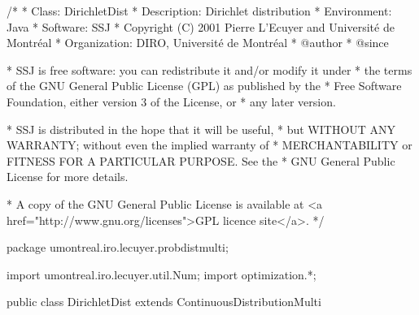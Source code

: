 \begin{code}
\begin{hide}
/*
 * Class:        DirichletDist
 * Description:  Dirichlet distribution
 * Environment:  Java
 * Software:     SSJ 
 * Copyright (C) 2001  Pierre L'Ecuyer and Université de Montréal
 * Organization: DIRO, Université de Montréal
 * @author       
 * @since

 * SSJ is free software: you can redistribute it and/or modify it under
 * the terms of the GNU General Public License (GPL) as published by the
 * Free Software Foundation, either version 3 of the License, or
 * any later version.

 * SSJ is distributed in the hope that it will be useful,
 * but WITHOUT ANY WARRANTY; without even the implied warranty of
 * MERCHANTABILITY or FITNESS FOR A PARTICULAR PURPOSE.  See the
 * GNU General Public License for more details.

 * A copy of the GNU General Public License is available at
   <a href="http://www.gnu.org/licenses">GPL licence site</a>.
 */
\end{hide}
package umontreal.iro.lecuyer.probdistmulti;
\begin{hide}
import umontreal.iro.lecuyer.util.Num;
import optimization.*;
\end{hide}

public class DirichletDist extends ContinuousDistributionMulti \begin{hide} {
   private static final double LOGMIN = -709.1;    // Log(MIN_DOUBLE/2)
   protected double[] alpha;

   private static class Optim implements Uncmin_methods
   {
      double[] logP;
      int n;
      int k;

      public Optim (double[] logP, int n) {
         this.n = n;
         this.k = logP.length;
         this.logP = new double[k];
         System.arraycopy (logP, 0, this.logP, 0, k);
      }

      public double f_to_minimize (double[] alpha) {
         double sumAlpha = 0.0;
         double sumLnGammaAlpha = 0.0;
         double sumAlphaLnP = 0.0;

         for (int i = 1; i < alpha.length; i++) {
            if (alpha[i] <= 0.0)
               return 1.0e200;

            sumAlpha += alpha[i];
            sumLnGammaAlpha += Num.lnGamma (alpha[i]);
            sumAlphaLnP += ((alpha[i] - 1.0) * logP[i - 1]);
         }

         return (- n * (Num.lnGamma (sumAlpha) - sumLnGammaAlpha + sumAlphaLnP));
      }

      public void gradient (double[] alpha, double[] g)
      {
      }

      public void hessian (double[] alpha, double[][] h)
      {
      }
   }
\end{hide}
\end{code}
